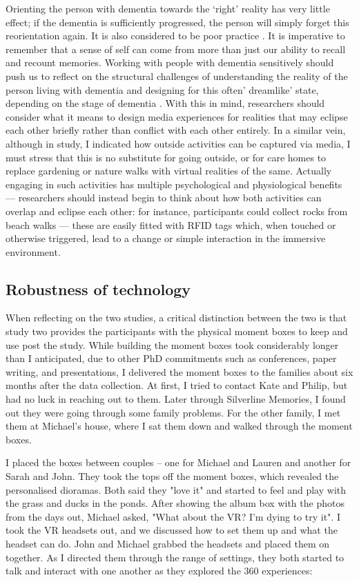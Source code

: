 Orienting the person with dementia towards the `right' reality has very little effect; if the dementia is sufficiently progressed, the person will simply forget this reorientation again. It is also considered to be poor practice \citep{cipriani_understanding_2014}. It is imperative to remember that a sense of self can come from more than just our ability to recall and recount memories. Working with people with dementia sensitively should push us to reflect on the structural challenges of understanding the reality of the person living with dementia and designing for this often' dreamlike' state, depending on the stage of dementia \citep{bryden_before_2015}. With this in mind, researchers should consider what it means to design media experiences for realities that may eclipse each other briefly rather than conflict with each other entirely. In a similar vein,  although in study, I indicated how outside activities can be captured via media, I must stress that this is no substitute for going outside, or for care homes to replace gardening or nature walks with virtual realities of the same. Actually engaging in such activities has multiple psychological and physiological benefits \citep{gilliard_transforming_2011} — researchers should instead begin to think about how both activities can overlap and eclipse each other: for instance, participants could collect rocks from beach walks — these are easily fitted with RFID tags which, when touched or otherwise triggered, lead to a change or simple interaction in the immersive environment.

\subsection{Robustness of technology}
\label{robust-tech}
When reflecting on the two studies, a critical distinction between the two is that study two provides the participants with the physical moment boxes to keep and use post the study. While building the moment boxes took considerably longer than I anticipated, due to other PhD commitments such as conferences, paper writing, and presentations, I delivered the moment boxes to the families about six months after the data collection. At first, I tried to contact Kate and Philip, but had no luck in reaching out to them. Later through Silverline Memories, I found out they were going through some family problems. For the other family, I met them at Michael's house, where I sat them down and walked through the moment boxes.

I placed the boxes between couples – one for Michael and Lauren and another for Sarah and John. They took the tops off the moment boxes, which revealed the personalised dioramas. Both said they "love it" and started to feel and play with the grass and ducks in the ponds. After showing the album box with the photos from the days out, Michael asked, "What about the VR? I'm dying to try it". I took the VR headsets out, and we discussed how to set them up and what the headset can do. John and Michael grabbed the headsets and placed them on together. As I directed them through the range of settings, they both started to talk and interact with one another as they explored the 360 experiences:

